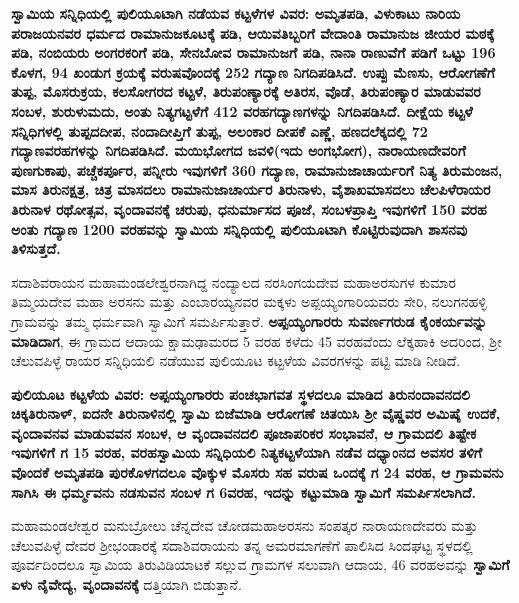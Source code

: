 \textbf{ಸ್ವಾಮಿಯ ಸನ್ನಿಧಿಯಲ್ಲಿ ಪುಲಿಯೂಟಾಗಿ ನಡೆಯವ ಕಟ್ಟಳೆಗಳ ವಿವರ: ಅಮೃತಪಡಿ, ವಿಳುಕಾಟು ನಾರಿಯ ಪರಾಜಯನವರ ಧರ್ಮದ ರಾಮಾನುಜಕೂಟಕ್ಕೆ ಪಡಿ, ಆಯಿವತಿಬ್ಬರಿಗೆ ವೇದಾಂತಿ ರಾಮಾನುಜ ಜೀಯರ ಮಠಕ್ಕೆ ಪಡಿ, ನಂಬಿಯರು ಅಂಗರಕರಿಗೆ ಪಡಿ, ಸೇನಬೋವ ರಾಮಾನುಜಗೆ ಪಡಿ, ನಾನಾ ರಾಣುವೆಗೆ ಪಡಿಗೆ ಒಟ್ಟು 196 ಕೊಳಗ, 94 ಖಂಡುಗ ಕ್ರಯಕ್ಕೆ ವರುಷವೊಂದಕ್ಕೆ 252 ಗದ್ಯಾಣ ನಿಗದಿಪಡಿಸಿದೆ. ಉಪ್ಪು ಮೆಣಸು, ಆರೋಗಣೆಗೆ ತುಪ್ಪ, ಮೊಸರುಕ್ರಯ, ಕಲಸೋಗರದ ಕಟ್ಟಳೆ, ತಿರುಪಂಣ್ಯಾರಕ್ಕೆ ಅತಿರಸ, ವೊಡೆ, ತಿರುಪಂಣ್ಯಾರ ಮಾಡುವವರ ಸಂಬಳ, ಶುರುಳುಮದು, ಅಂತು ನಿತ್ಯಗಟ್ಟಳೆಗೆ 412 ವರಹಗದ್ಯಾಣಗಳನ್ನು ನಿಗದಿಪಡಿಸಿದೆ. ದೀಕ್ಷೆಯ ಕಟ್ಟಳೆ ಸನ್ನಿಧಿಗಳಲ್ಲಿ ತುಪ್ಪದದೀಪ, ನಂದಾದೀಪ್ತಿಗೆ ತುಪ್ಪ, ಅಲಂಕಾರ ದೀಪಕೆ ಎಣ್ಣೆ, ಹಣದಲೆಕ್ಕದಲ್ಲಿ 72 ಗದ್ಯಾಣವರಹಗಳನ್ನು ನಿಗದಿಪಡಿಸಿದೆ. ಮಯಿಭೋಗದ ಜವಳಿ(ಇದು ಅಂಗಭೋಗ), ನಾರಾಯಣದೇವರಿಗೆ ಪುಣಗುಕಾಪು, ಪಚ್ಚೆಕರ್ಪೂರ, ಪನ್ನೀರು ಇವುಗಳಿಗೆ 360 ಗದ್ಯಾಣ, ರಾಮಾನುಜಾಚಾರ್ಯರಿಗೆ ನಿತ್ಯ ತಿರುಮಂಜನ, ಮಾಸ ತಿರುನಕ್ಷತ್ರ, ಚಿತ್ರ ಮಾಸದಲು ರಾಮಾನುಜಾಚಾರ್ಯರ ತಿರುನಾಳು, ವೈಶಾಖಮಾಸದಲು ಚೆಲಪಿಳೆರಾಯರ ತಿರುನಾಳ ರಥೋತ್ಸವ, ವೃಂದಾವನಕ್ಕೆ ಚರುಪು, ಧನುರ್ಮಾಸದ ಪೂಜೆ, ಸಂಬಳಪ್ರಾಪ್ತಿ ಇವುಗಳಿಗೆ 150 ವರಹ ಅಂತು ಗದ್ಯಾಣ 1200 ವರಹವನ್ನು ಸ್ವಾಮಿಯ ಸನ್ನಿಧಿಯಲ್ಲಿ ಪುಲಿಯೂಟಾಗಿ ಕೊಟ್ಟಿರುವುದಾಗಿ ಶಾಸನವು ತಿಳಿಸುತ್ತದೆ.}

ಸದಾಶಿವರಾಯನ ಮಹಾಮಂಡಲೇಶ್ವರನಾಗಿದ್ದ ನಂದ್ಯಾಲದ ನರಸಿಂಗಯದೇವ ಮಹಾಅರಸುಗಳ ಕುಮಾರ ತಿಮ್ಮಯದೇವ ಮಹಾ ಅರಸನು ಮತ್ತು ಎಂಬಾರಯ್ಯನವರ ಮಕ್ಕಳು ಅಪ್ಪಯ್ಯಂಗಾರಿಯವರು ಸೇರಿ, ನಲುಗನಹಳ್ಳಿ ಗ್ರಾಮವನ್ನು ತಮ್ಮ ಧರ್ಮವಾಗಿ ಸ್ವಾಮಿಗೆ ಸಮರ್ಪಿಸುತ್ತಾರೆ. \textbf{ಅಪ್ಪಯ್ಯಂಗಾರರು ಸುವರ್ಣಗರುಡ ಕೈಂಕರ್ಯವನ್ನು ಮಾಡಿದಾಗ}, ಈ ಗ್ರಾಮದ ಆದಾಯ ಕ್ಷಾಮಢಾಮರದ 5 ವರಹ ಕಳೆದು 45 ವರಹವೆಂದು ಲೆಕ್ಕಹಾಕಿ ಅದರಿಂದ, ಶ‍್ರೀ ಚೆಲುವಪಿಳ್ಳೆ ರಾಯರ ಸನ್ನಿಧಿಯಲಿ ನಡೆಯುವ ಪುಲಿಯೂಟ ಕಟ್ಟಳೆಯ ವಿವರಗಳನ್ನು ಪಟ್ಟಿ ಮಾಡಿ ನೀಡಿದೆ.

\textbf{ಪುಲಿಯೂಟ ಕಟ್ಟಳೆಯ ವಿವರ: ಅಪ್ಪಯ್ಯಂಗಾರರು ಪಂಚಭಾಗವತ ಸ್ಥಳದಲೂ ಮಾಡಿದ ತಿರುನಂದಾವನದಲಿ ಚಿಕ್ಕತಿರುನಾಳ್​, ಐದನೇ ತಿರುನಾಳಿನಲ್ಲಿ ಸ್ವಾಮಿ ಬಿಜೆಮಾಡಿ ಆರೋಗಣೆ ಚಿತಯಿಸಿ ಶ‍್ರೀ ವೈಷ್ಣವರ ಅಮಿಷೈ ಉದಕೆ, ವೃಂದಾವನವ ಮಾಡುವವನ ಸಂಬಳ, ಆ ವೃಂದಾವನದಲಿ ಪೂಜಾಪರಿಕರ ಸಂಭಾವನೆ, ಆ ಗ್ರಾಮದಲಿ ತಿಷ್ಟೇಕ ಇವುಗಳಿಗೆ ಗ 15 ವರಹ, ವರಹಸ್ವಾಮಿಯ ಸನ್ನಿಧಿಯಲಿ ನಿತ್ಯಕಟ್ಟಳೆಯಾಗಿ ನಡೆವ ದಧ್ಯಾಂನದ ಅವಸರ ತಳಿಗೆ ವೊಂದಕೆ ಅಮೃತಪಡಿ ಪುರಕೊಳಗದಲೂ ವೊಕ್ಕುಳ ಮೊಸರು ಸಹ ವರುಷ ಒಂದಕ್ಕೆ ಗ 24 ವರಹ, ಆ ಗ್ರಾಮವನು ಸಾಗಿಸಿ ಈ ಧರ್ಮ್ಮವನು ನಡಸುವನ ಸಂಬಳ ಗ 6ವರಹ, ಇದನ್ನು ಕಟ್ಟುಮಾಡಿ ಸ್ವಾಮಿಗೆ ಸಮರ್ಪಿಸಲಾಗಿದೆ.}

ಮಹಾಮಂಡಲೇಶ್ವರ ಮನುಬ್ರೋಲು ಚೆನ್ನದೇವ ಚೋಡಮಹಾಅರಸನು ಸಂಪತ್ಕರ ನಾರಾಯಣದೇವರು ಮತ್ತು ಚೆಲುವಪಿಳ್ಳೆ ದೇವರ ಶ‍್ರೀಭಂಡಾರಕ್ಕೆ ಸದಾಶಿವರಾಯನು ತನ್ನ ಅಮರಮಾಗಣೆಗೆ ಪಾಲಿಸಿದ ಸಿಂದಘಟ್ಟ ಸ್ಥಳದಲ್ಲಿ ಪೂರ್ವದಿಂದಲೂ ಸ್ವಾಮಿಯ ತಿರುವಿಡಿಯಾಟಕೆ ಸಲ್ಲುವ ಗ್ರಾಮಗಳ ಸಲುವಾಗಿ ಆದಾಯ, 46 ವರಹಅವನ್ನು \textbf{ಸ್ವಾಮಿಗೆ ಏಳು ನೈವೇದ್ಯ, ವೃಂದಾವನಕ್ಕೆ} ದತ್ತಿಯಾಗಿ ಬಿಡುತ್ತಾನೆ.

